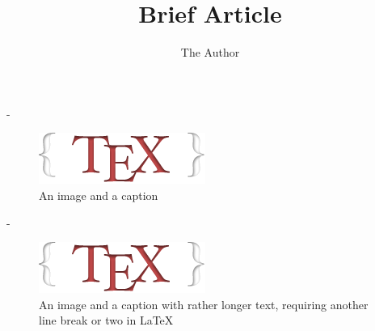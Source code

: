 \documentclass[twoside]{article}
\title{Brief Article}
\author{The Author}
\makeatletter
\newlength{\overhang}
\newenvironment{fullwidth}{%
  \begin{adjustwidth\if@twoside*\fi}{}{-\overhang}}{%
  \end{adjustwidth\if@twoside*\fi}}
\makeatother
\begin{document}
\maketitle

\lipsum[1]

\begin{fullwidth}
  \begin{multicols}{2}
    \lipsum[2]
  \end{multicols}
  \begin{figure}[htbp]
    \centering
    \includegraphics{./logo.png}
    \caption{An image and a caption}
  \end{figure}
\end{fullwidth}

\lipsum[3-4]

\begin{fullwidth}
  \lipsum[5]
  \begin{figure}[htbp]
    \centering
    \includegraphics{./logo.png}
    \caption{An image and a caption with rather longer text, requiring another line break or two in \LaTeX}
  \end{figure}
  \begin{multicols}{2}
    \lipsum[6]
  \end{multicols}
\end{fullwidth}

\lipsum[7]
\end{document}
